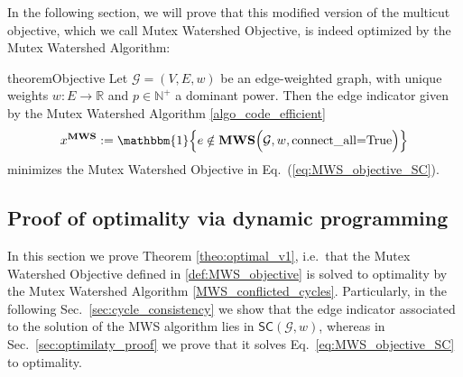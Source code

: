 In the following section, we will prove that this modified version of the multicut objective, which we call Mutex Watershed Objective, is indeed optimized by the Mutex Watershed Algorithm:

\begin{restatable}{theorem}{Objective}\label{theo:optimal_v1}
Let $\mathcal{G} = (V, E, w)$ be an edge-weighted graph, with unique weights $w:E \rightarrow \mathbb{R}$ and $p \in \mathbb{N}^+$ a dominant power. Then the edge indicator given by the Mutex Watershed Algorithm \ref{algo_code_efficient} $$x^{\mathbf{MWS}} := \mathbbm{1}\Big\{e \notin \mathbf{MWS}\Big(\mathcal{G}, w, \operator{connect\_all=True}\Big)\Big\}$$ minimizes the Mutex Watershed Objective in Eq.~(\ref{eq:MWS_objective_SC}).
\end{restatable} 
\noindent 

\subsection{Proof of optimality via dynamic programming} \label{sec:optimality_MWS}


    

In this section we prove Theorem \ref{theo:optimal_v1}, i.e.\ that the Mutex Watershed Objective defined in \ref{def:MWS_objective} is solved to optimality by the Mutex Watershed Algorithm \ref{MWS_conflicted_cycles}. Particularly, in the following Sec.~\ref{sec:cycle_consistency} we show that the edge indicator associated to the solution of the MWS algorithm lies in $\mathsf{SC}(\mathcal{G},w)$, whereas in Sec.~\ref{sec:optimilaty_proof} we prove that it solves Eq.~\ref{eq:MWS_objective_SC} to optimality.


